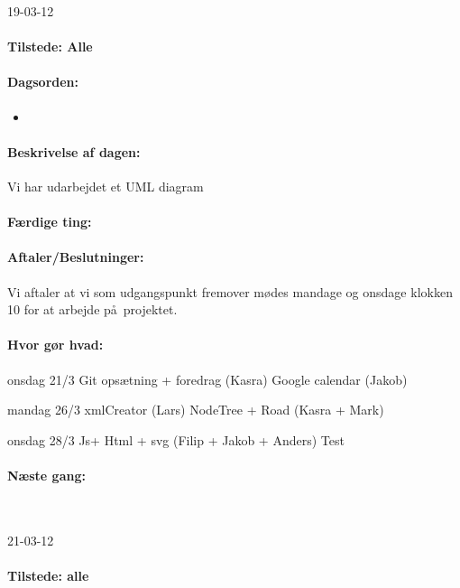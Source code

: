 \documentclass[a4paper,10pt,titlepage]{article}
\begin{document}
		\begin{center}
		19-03-12
		\end{center}
		
		\paragraph{Tilstede: Alle}
		\paragraph{Dagsorden:}
		\begin{itemize}
					\item 
		\end{itemize}
		
		\paragraph{Beskrivelse af dagen:}
		Vi har udarbejdet et UML diagram
		\paragraph{F\ae rdige ting:}
		
		\paragraph{Aftaler/Beslutninger:}
		Vi aftaler at vi som udgangspunkt fremover m\o des mandage og onsdage klokken 10 for at arbejde p\aa \ projektet.
		\paragraph{Hvor g\o r hvad:}
		onsdag 21/3
Git ops\ae tning + foredrag (Kasra)
Google calendar (Jakob)

mandag 26/3
xmlCreator (Lars)
NodeTree + Road (Kasra + Mark)

onsdag 28/3
Js+ Html + svg (Filip + Jakob + Anders)
Test
		\paragraph{N\ae ste gang:}\mbox{}\\
			
			
			\begin{center}
		21-03-12
		\end{center}
		
		\paragraph{Tilstede: alle}
\end{document}
